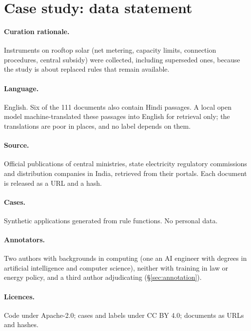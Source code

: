 \section{Case study: data statement}
\label{app:datastatement}
\paragraph{Curation rationale.} Instruments on rooftop solar (net metering, capacity limits,
connection procedures, central subsidy) were collected, including superseded ones, because the study
is about replaced rules that remain available.
\paragraph{Language.} English. Six of the 111 documents also contain Hindi passages. A local open model
machine-translated these passages into English for retrieval only; the translations are poor in places, and no label
depends on them.
\paragraph{Source.} Official publications of central ministries, state electricity regulatory
commissions and distribution companies in India, retrieved from their portals. Each document is
released as a URL and a hash.
\paragraph{Cases.} Synthetic applications generated from rule functions. No personal data.
\paragraph{Annotators.} Two authors with backgrounds in computing (one an AI engineer with degrees in
artificial intelligence and computer science), neither with training in law or energy policy, and a third author
adjudicating (\S\ref{sec:annotation}).
\paragraph{Licences.} Code under Apache-2.0; cases and labels under CC BY 4.0; documents as URLs and
hashes.
